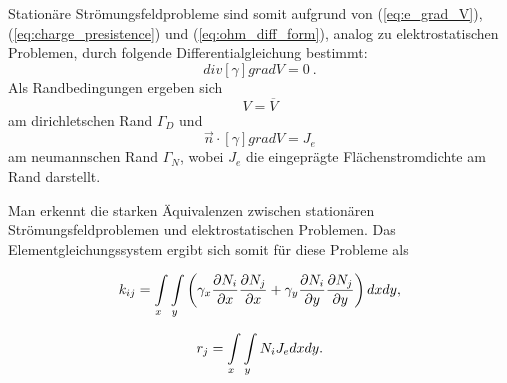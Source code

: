  Stationäre Strömungsfeldprobleme sind somit aufgrund von (\ref{eq:e_grad_V}), (\ref{eq:charge_presistence}) und (\ref{eq:ohm_diff_form}), analog zu elektrostatischen Problemen, durch folgende Differentialgleichung bestimmt:
 \begin{equation}
\mathit{div}[\gamma]\mathit{grad}V = 0 \ .
 \end{equation}
 Als Randbedingungen ergeben sich
 \begin{equation}
 \label{eq:current_dirichlet_condition}
 V = \overline{V}
 \end{equation}
 am dirichletschen Rand $\Gamma_D$ und 
 \begin{equation}
 \label{eq:current_neumann_condition}
 \vec{n}\cdot[\gamma]\mathit{grad}V = J_e
 \end{equation}
 am neumannschen Rand $\Gamma_N$, wobei $J_e$ die eingeprägte Flächenstromdichte am Rand darstellt.\newline
 
 Man erkennt die starken Äquivalenzen zwischen stationären Strömungsfeldproblemen und elektrostatischen Problemen. Das Elementgleichungssystem ergibt sich somit für diese Probleme als
 
\begin{equation}
\label{eq:k_ij_stat_current}
k_{ij} = \int\displaylimits_{x} \int\displaylimits_{y} \left(\gamma_x \frac{\partial N_i}{\partial x}\frac{\partial N_j}{\partial x} +  \gamma_y\frac{\partial N_i}{\partial y}\frac{\partial N_j}{\partial y}\right)dx dy,
\end{equation}

\begin{equation}
\label{eq:right_side_stat_current}
r_j = \int\displaylimits_{x} \int\displaylimits_{y} N_i J_e dx dy.
\end{equation}


